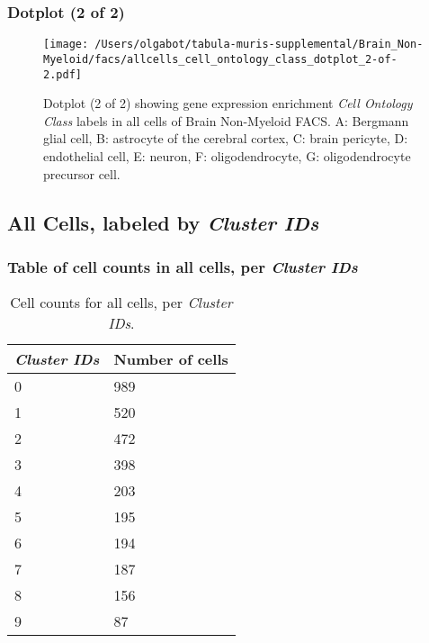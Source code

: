 \clearpage

\subsubsection{Dotplot (2 of 2)}
\begin{figure}[h]
\centering
\texttt{[image: /Users/olgabot/tabula-muris-supplemental/Brain\_Non-Myeloid/facs/allcells\_cell\_ontology\_class\_dotplot\_2-of-2.pdf]}

\caption{ Dotplot (2 of 2)  showing gene expression enrichment \emph{Cell Ontology Class} labels in all cells of Brain Non-Myeloid FACS. A: Bergmann glial cell, B: astrocyte of the cerebral cortex, C: brain pericyte, D: endothelial cell, E: neuron, F: oligodendrocyte, G: oligodendrocyte precursor cell.}
\end{figure}


\clearpage

\subsection{All Cells, labeled by \emph{Cluster IDs}}
\subsubsection{Table of cell counts in all cells, per \emph{Cluster IDs}}\begin{table}[h]
\centering
\label{my-label}
\begin{tabular}{@{}ll@{}}
\toprule

\emph{Cluster IDs}& Number of cells \\ \midrule
0 & 989 \\

1 & 520 \\

2 & 472 \\

3 & 398 \\

4 & 203 \\

5 & 195 \\

6 & 194 \\

7 & 187 \\

8 & 156 \\

9 & 87 \\
\bottomrule
\end{tabular}
\caption{Cell counts for all cells, per \emph{Cluster IDs}.}
\end{table}

